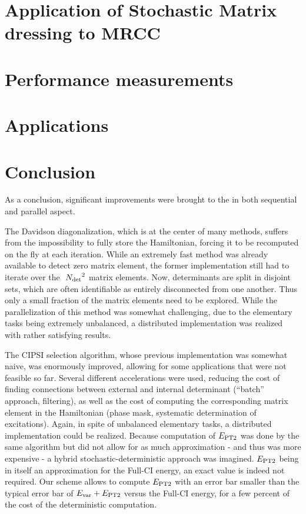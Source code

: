 \documentclass[12pt,a4paper]{report}
\begin{document}
\chapter{Application of Stochastic Matrix dressing to MRCC}
\minitoc


\chapter{Performance measurements}
\minitoc


\chapter{Applications}
\minitoc


\chapter{Conclusion}

As a conclusion, significant improvements were brought to the \QP in both sequential and parallel aspect.

The Davidson diagonalization, which is at the center of many methods, suffers from the impossibility to fully store the Hamiltonian, forcing it to be recomputed on the fly at each iteration. While an extremely fast method was already available to detect zero matrix element,\cite{Scemama_2013} the former implementation still had to iterate over the $~{N_\text{det}}^2$ matrix elements. Now, determinants are split in disjoint sets, which are often identifiable as entirely disconnected from one another. Thus only a small fraction of the matrix elements need to be explored.
While the parallelization of this method was somewhat challenging, due to the elementary tasks being extremely unbalanced, a distributed implementation was realized with rather satisfying results.

The CIPSI selection algorithm, whose previous implementation was somewhat naive, was enormously improved, allowing for some applications that were not feasible so far\cite{Scemama_2018,1806.05115}. Several different accelerations were used, reducing the cost of finding connections between external and internal determinant (``batch'' approach, filtering), as well as the cost of computing the corresponding matrix element in the Hamiltonian (phase mask, systematic determination of excitations). Again, in spite of unbalanced elementary tasks, a distributed implementation could be realized.
Because computation of $E_\text{PT2}$ was done by the same algorithm but did not allow for as much approximation - and thus was more expensive - a hybrid stochastic-deterministic approach was imagined. $E_\text{PT2}$ being in itself an approximation for the Full-CI energy, an exact value is indeed not required. Our scheme allows to compute $E_\text{PT2}$ with an error bar smaller than the typical error bar of $E_{\text{var}} + E_\text{PT2}$ versus the Full-CI energy, for a few percent of the cost of the deterministic computation.
\end{document}

